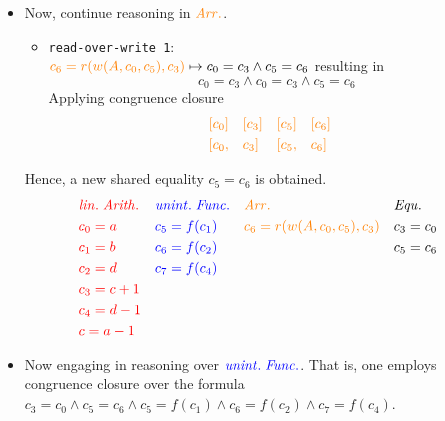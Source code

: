 \documentclass[11pt,a4paper]{article}
\begin{document}
\begin{enumerate}
\begin{itemize}
\item Now, continue reasoning in $\textcolor{orange}{ \mathit{Arr.}}$.
\begin{itemize}
\item \texttt{read-over-write 1}: \\
$\textcolor{orange}{ c_6 = r(w(A, c_0, c_5), c_3) } \mapsto c_0 = c_3 \land c_5 = c_6$ resulting in 
\begin{equation*}
c_0 = c_3 \land c_0 = c_3 \land c_5 = c_6
\end{equation*}
Applying congruence closure
\begin{align*}
& \textcolor{orange}{[c_0]} && \textcolor{orange}{[c_3]} && \textcolor{orange}{[c_5]} && \textcolor{orange}{[c_6]} & \\
& \textcolor{orange}{[c_0,} && \textcolor{orange}{ c_3]} && \textcolor{orange}{[c_5,} && \textcolor{orange}{ c_6]} & \\
\end{align*}
\end{itemize}
Hence, a new shared equality $c_5 = c_6$ is obtained.
\begin{align*}
& \textcolor{red}{ \mathit{lin. \; Arith.} }  && \textcolor{blue}{ \mathit{unint. \; Func.}} && \textcolor{orange}{ \mathit{Arr.}} && \mathit{Equ.}  &\\
& \textcolor{red}{c_0 = a }  && \textcolor{blue}{ c_5 = f(c_1)  } && \textcolor{orange}{ c_6 = r(w(A, c_0, c_5), c_3) } && c_3 = c_0 &\\
& \textcolor{red}{c_1 = b }  && \textcolor{blue}{ c_6 = f(c_2) } && \textcolor{orange}{ } &&  c_5 = c_6 &\\
& \textcolor{red}{c_2 = d }  && \textcolor{blue}{ c_7 = f(c_4) } && \textcolor{orange}{ } &&  &\\
& \textcolor{red}{c_3 = c +1  }  && \textcolor{blue}{ } && \textcolor{orange}{ } &&  &\\
& \textcolor{red}{c_4 = d-1 }  && \textcolor{blue}{ } && \textcolor{orange}{ } &&  &\\
& \textcolor{red}{ c = a - 1}  && \textcolor{blue}{ } && \textcolor{orange}{ } &&  &\\
\end{align*}

\item Now engaging in reasoning over $\textcolor{blue}{ \mathit{unint. \; Func.}}$. That is, one employs congruence closure over the formula $c_3 = c_0  \land c_5 = c_6  \land c_5 = f(c_1) \land c_6 = f(c_2) \land  c_7 = f(c_4)$.


\end{itemize}
\end{enumerate}
\end{document}

